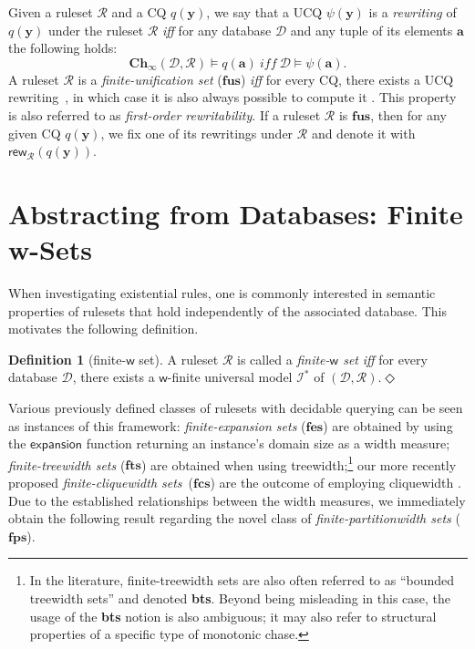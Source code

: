 \documentclass[10pt,a4paper]{amsart}
\theoremstyle{definition}
\numberwithin{equation}{section}
\theoremstyle{plain}
\theoremstyle{definition}
\newtheorem{definition}[definition]{Definition}
\theoremstyle{myexample}
\theoremstyle{plain}
\theoremstyle{definition}
\renewcommand{\vec}[1]{\boldsymbol{#1}}
\newcommand{\vecconst}[1]{\mathtt{\mathbf{#1}}}
\newcommand{\instance}{\mathcal{I}}
\newcommand{\database}{\mathcal{D}}
\newcommand{\db}{\database}
\newcommand{\ercwidth}{\partitionwidth}
\newcommand{\partitionwidth}{par\-ti\-tion\-width}
\newcommand{\fcn}[1]{\mathsf{#1}}
\newcommand{\ruleset}{\calr}
\newcommand{\bts}{\mathbf{fts}}
\newcommand{\fes}{\mathbf{fes}}
\newcommand{\fus}{\mathbf{fus}}
\newcommand{\fcs}{\mathbf{fcs}}
\newcommand{\fps}{\mathbf{fps}} %
\newcommand{\hcs}{\fps}
\newcommand{\fhcs}{\hcs}
\newcommand{\chase}{\mathbf{Ch}}
\newcommand{\ksat}[2]{\chase_{#1}(#2)}
\newcommand{\sat}[1]{\ksat{\infty}{#1}}
\newcommand{\rewrs}[2]{\fcn{rew}_{#1}(#2)}
\newcommand{\calr}{\mathcal{R}}
\newcommand{\vy}{\vec{y}}
\newcommand{\query}{q}
\newcommand{\ifandonlyif}{\textit{iff} } %
\newcommand{\iffi}{\textit{iff} } %
\newcommand{\defend}{\hfill\ensuremath{\Diamond}}
\begin{document}
\medskip {}
Given a ruleset $\ruleset$ and a CQ $\query(\vy)$, we say that a UCQ $\psi(\vy)$ is a {\em rewriting} of $\query(\vy)$ under the ruleset $\ruleset$ \ifandonlyif for any database $\database$ and any tuple of its elements $\vecconst{a}$ the following holds:
%
$$\sat{\database,\ruleset} \models \query(\mbox{$\vecconst{a}$}) \ \ifandonlyif \ \database \models \psi(\vecconst{a}).$$%
%
A ruleset $\ruleset$ is a {\em finite-unification set} ($\fus$) \iffi for every CQ, there exists a UCQ rewriting~\cite{BagLecMugSal11}, in which case it is also always possible to compute it \cite{fusalgo}. This property is also referred to as \emph{first-order rewritability}.
%
If a ruleset $\ruleset$ is $\fus$, then for any given CQ $\query(\vy)$, we fix one of its rewritings under $\ruleset$ and denote it with $\rewrs{\ruleset}{\query(\vy)}$.

%



\section{Abstracting from Databases: Finite w-Sets}\label{sec:finitewsets}

When investigating existential rules, one is commonly interested in semantic properties of rulesets that hold independently of the associated database. This motivates the following definition.

\begin{definition}[finite-$\fcn{w}$ set]\label{def:finitewset}
	A ruleset $\ruleset$ is called a \emph{finite-$\fcn{w}$ set} \iffi for every database $\database$, there exists a $\fcn{w}$-finite universal model $\instance^*$ of $(\db,\ruleset)$.\defend
\end{definition}

Various previously defined classes of rulesets with decidable querying can be seen as instances of this framework: \emph{finite-expansion sets} ($\fes$) are obtained by using the $\fcn{expansion}$ function returning an instance's domain size as a width measure; \emph{finite-treewidth sets} ($\bts$) are obtained when using treewidth;\footnote{In the literature, finite-treewidth sets are also often referred to as ``bounded treewidth sets'' and denoted \textbf{bts}. Beyond being misleading in this case, the usage of the \textbf{bts} notion is also ambiguous; it may also refer to structural properties of a specific type of monotonic chase.} our more recently proposed \emph{finite-cliquewidth sets}~($\fcs$) are the outcome of employing cliquewidth \cite{ICDT2023}. Due to the established relationships between the width measures, we immediately obtain the following result regarding the novel class of \emph{finite-\ercwidth{} sets} ($\fhcs$).
\end{document}
